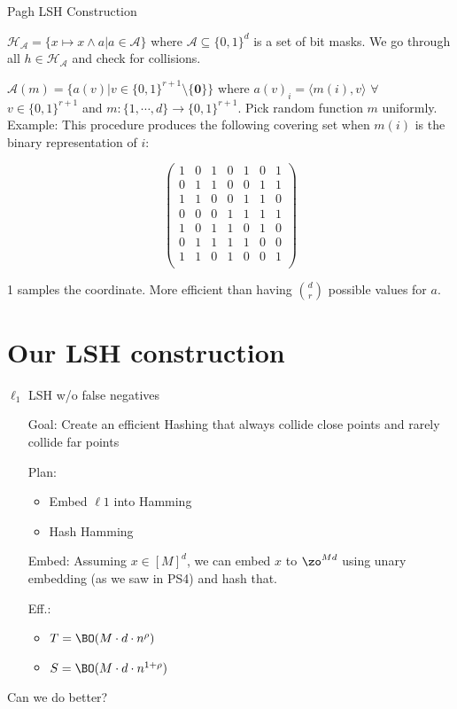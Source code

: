 \documentclass[xcolor=svgnames]{beamer}
\begin{document}
\begin{frame}{Pagh LSH Construction}

\small{
$\mathcal{H}_{\mathcal{A}} = \{x \mapsto x \wedge a | a \in \mathcal{A}\}$ where $\mathcal{A} \subseteq \{0,1\}^d$ is a set of bit masks. We go through all $h \in \mathcal{H}_{\mathcal{A}}$ and check for collisions.

$\mathcal{A}(m) = \{a(v) | v \in \{0,1\}^{r+1} \setminus \{\mathbf{0}\}\}$ where $a(v)_i = \langle m(i),v \rangle$ $\forall$ $v \in \{0,1\}^{r+1}$ and $m : \{1,\cdots,d\} \rightarrow \{0,1\}^{r+1}$.\newline
Pick random function $m$ uniformly.\newline
Example: This procedure produces the following covering set when $m(i)$ is the binary representation of $i$:
}

\[ \left( \begin{array}{ccccccc}
1 & 0 & 1 & 0 & 1 & 0 & 1 \\
0 & 1 & 1 & 0 & 0 & 1 & 1 \\
1 & 1 & 0 & 0 & 1 & 1 & 0 \\
0 & 0 & 0 & 1 & 1 & 1 & 1 \\
1 & 0 & 1 & 1 & 0 & 1 & 0 \\
0 & 1 & 1 & 1 & 1 & 0 & 0 \\
1 & 1 & 0 & 1 & 0 & 0 & 1 \\
\end{array} \right)\] 

\small{1 samples the coordinate. More efficient than having ${d \choose r}$ possible values for $a$.}

\end{frame}

\section{Our LSH construction}

\begin{frame}{$\ell_1$ LSH w/o false negatives}
\pause
\begin{enumerate}
\item[Goal:] Create an efficient Hashing that always collide close points and rarely collide far points
\pause
\item[Plan:] 
\begin{itemize}
\item Embed $\ell1$ into Hamming 
\item Hash Hamming
\end{itemize} 
\pause
\item[Embed:] Assuming $x \in [M]^d$, we can embed $x$ to $\zo^{Md}$ using unary embedding (as we saw in PS4) and hash that.
\pause
\item[Eff.:] 
\begin{itemize}
\item $T = \BO(M \cdot d \cdot n^\rho)$ 
\item $S = \BO(M \cdot d \cdot n^{1+\rho})$ 
\end{itemize} 
\end{enumerate}
\pause
\centering
{\Large Can we do better?}
\end{frame}
\end{document}
